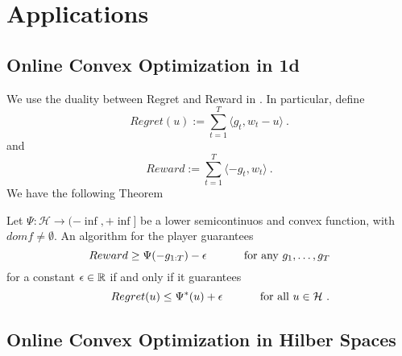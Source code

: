 \section{Applications}


\subsection{Online Convex Optimization in 1d}
We use the duality between Regret and Reward in \cite{McMahanO14}.
In particular, define
\[
Regret(u) := \sum_{t=1}^T \langle g_t ,w_t - u \rangle~.
\]
and
\[
Reward := \sum_{t=1}^T \langle -g_t, w_t \rangle~.
\]
We have the following Theorem
\begin{theorem}\label{thm:rrdual}
  Let $\Psi:\mathcal{H} \rightarrow (-\inf, +\inf]$ be a lower semicontinuos and convex function, with $dom f \neq \emptyset$. An
  algorithm for the player guarantees
  \[
  Reward \geq \Psi(-g_{1:T}) - \epsilon \quad \quad \quad \textnormal{ for any } g_1, \dots, g_T
  \]
  for a constant $\epsilon \in \mathbb{R}$ if and only if it
  guarantees
  \begin{equation}\label{eq:regb}
  \qquad Regret(u) \leq \Psi^*(u) + \epsilon \quad \quad \quad \textnormal{ for all } u \in \mathcal{H}~.
  \end{equation}
\end{theorem}

\subsection{Online Convex Optimization in Hilber Spaces}